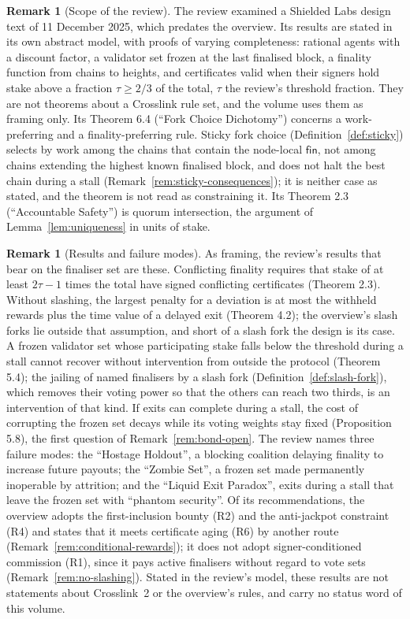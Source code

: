 \documentclass[11pt,a4paper]{article}
\theoremstyle{definition}
\newtheorem{remark}[theorem]{Remark}
\newcommand{\fin}{\mathsf{fin}}
\begin{document}
\begin{remark}[Scope of the review]\label{rem:review-scope}
The review examined a Shielded Labs design text of 11 December 2025, which
predates the overview. Its results are stated in its own abstract model,
with proofs of varying completeness: rational agents with a discount factor, a
validator set frozen at the last finalised block, a finality function from
chains to heights, and certificates valid when their signers hold stake above a
fraction $\tau \ge 2/3$ of the total, $\tau$ the review's threshold fraction.
They are not theorems about a Crosslink rule set, and the volume uses them as
framing only. Its Theorem 6.4 (``Fork Choice Dichotomy'') concerns a
work-preferring and a finality-preferring rule. Sticky fork choice
(Definition~\ref{def:sticky}) selects by work among the chains that contain
the node-local $\fin$, not among chains extending the highest known
finalised block, and does not halt the best chain during a stall
(Remark~\ref{rem:sticky-consequences}); it is neither case as stated, and the
theorem is not read as constraining it. Its Theorem 2.3 (``Accountable
Safety'') is quorum intersection, the argument of Lemma~\ref{lem:uniqueness} in
units of stake.
\end{remark}

\begin{remark}[Results and failure modes]\label{rem:review-results}
As framing, the review's results that bear on the finaliser set are these.
Conflicting finality requires that stake of at least $2\tau - 1$ times the
total have signed conflicting certificates (Theorem 2.3). Without slashing,
the largest penalty for a deviation is at most the withheld rewards plus the
time value of a delayed exit (Theorem 4.2); the overview's slash forks lie
outside that assumption, and short of a slash fork the design is its case.
A frozen validator set whose participating stake falls below the threshold
during a stall cannot recover without intervention from outside the protocol
(Theorem 5.4); the jailing of named finalisers by a slash fork
(Definition~\ref{def:slash-fork}), which removes their voting power so that
the others can reach two thirds, is an intervention of that kind. If exits
can complete during a stall, the cost of corrupting the frozen set decays
while its voting weights stay fixed (Proposition 5.8), the first question of
Remark~\ref{rem:bond-open}. The review names three failure modes: the
``Hostage Holdout'', a blocking coalition delaying finality to increase
future payouts; the ``Zombie Set'', a frozen set made permanently inoperable
by attrition; and the ``Liquid Exit Paradox'', exits during a stall that
leave the frozen set with ``phantom security''. Of its recommendations, the
overview adopts the first-inclusion bounty (R2) and the anti-jackpot
constraint (R4) and states that it meets certificate aging (R6) by another
route (Remark~\ref{rem:conditional-rewards}); it does not adopt
signer-conditioned commission (R1), since it pays active finalisers without
regard to vote sets (Remark~\ref{rem:no-slashing}). Stated in the review's
model, these results are not statements about Crosslink~2 or the overview's
rules, and carry no status word of this volume.
\end{remark}
\end{document}
